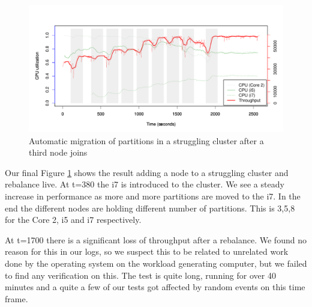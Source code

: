 \clearpage
\begin{figure}[h]
    \centering
    \includegraphics[width=1.0\textwidth]{results/adaptive3node}
    \caption{Automatic migration of partitions in a struggling cluster after a third node joins}
    \label{fig:adapt_3node}
\end{figure}
Our final Figure \ref{fig:adapt_3node} shows the result adding a node to a struggling cluster and rebalance live. At t=380 the i7 is introduced to the cluster. We see a steady increase in performance as more and more partitions are moved to the i7. In the end the different nodes are holding different number of partitions. This is 3,5,8 for the Core 2, i5 and i7 respectively. 

At t=1700 there is a significant loss of throughput after a rebalance. We found no reason for this in our logs, so we suspect this to be related to unrelated work done by the operating system on the workload generating computer, but we failed to find any verification on this. The test is quite long, running for over 40 minutes and a quite a few of our tests got affected by random events on this time frame.




